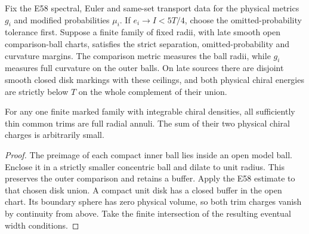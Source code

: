 \begin{proposition}
\label{prop:ed03-comparison-disks}
\leanok
Fix the E58 spectral, Euler and same-set transport data for the physical
metrics $g_i$ and modified probabilities $\mu_i$. If $e_i\to I<5T/4$,
choose the omitted-probability tolerance first. Suppose a finite family of
fixed radii, with late smooth open comparison-ball charts, satisfies the
strict separation, omitted-probability and curvature margins. The comparison
metric measures the ball radii, while $g_i$ measures full curvature on the
outer balls. On late sources there are disjoint smooth closed disk markings
with these ceilings, and both physical chiral energies are strictly below
$T$ on the whole complement of their union.

For any one finite marked family with integrable chiral densities, all
sufficiently thin common trims are full radial annuli. The sum of their
two physical chiral charges is arbitrarily small.
\end{proposition}
\begin{proof}
\leanok
The preimage of each compact inner ball lies inside an open model
ball. Enclose it in a strictly smaller concentric ball and dilate to
unit radius. This preserves the outer comparison and retains a buffer.
Apply the E58 estimate to that chosen disk union. A compact unit disk
has a closed buffer in the open chart. Its boundary sphere has zero
physical volume, so both trim charges vanish by continuity from above.
Take the finite intersection of the resulting eventual width conditions.
\end{proof}

